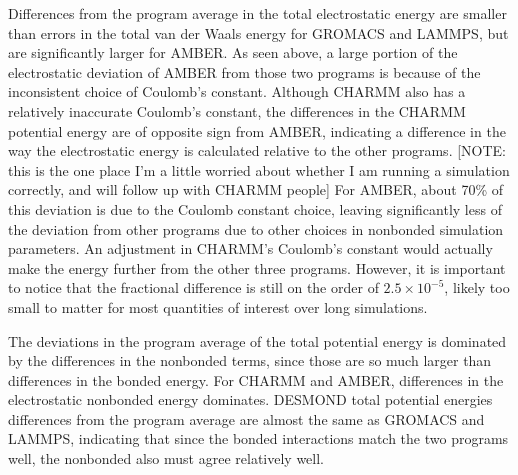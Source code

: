 Differences from the program average in the total electrostatic energy
are smaller than errors in the total van der Waals energy for GROMACS
and LAMMPS, but are significantly larger for AMBER.  As seen above, a
large portion of the electrostatic deviation of AMBER from those two
programs is because of the inconsistent choice of Coulomb's constant.
Although CHARMM also has a relatively inaccurate Coulomb's constant,
the differences in the CHARMM potential energy are of opposite sign from AMBER, indicating a difference in the way the
electrostatic energy is calculated relative to the other programs.  [NOTE:
  this is the one place I'm a little worried about whether I am
  running a simulation correctly, and will follow up with CHARMM
  people] 
For AMBER, about 70\% of this deviation is due to the
Coulomb constant choice, leaving significantly less of the deviation
from other programs due to other choices in nonbonded simulation
parameters. An adjustment in CHARMM's Coulomb's constant would
actually make the energy further from the other three programs.
However, it is important to notice that the fractional difference is
still on the order of $2.5 \times 10^{-5}$, likely too small to matter
for most quantities of interest over long simulations.

The deviations in the program average of the total potential energy is
dominated by the differences in the nonbonded terms, since those are
so much larger than differences in the bonded energy.  For CHARMM and
AMBER, differences in the electrostatic nonbonded energy
dominates. DESMOND total potential energies differences from the
program average are almost the same as GROMACS and LAMMPS, indicating
that since the bonded interactions match the two programs well, the
nonbonded also must agree relatively well.


